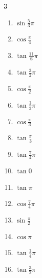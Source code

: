 \begin{multicols}{3}
\begin{enumerate}
  \item $\displaystyle \sin{\frac{5}{3}\pi}$

  \item $\displaystyle \cos{\frac{\pi}{4}}$

  \item $\displaystyle \tan{\frac{11}{6}\pi}$

  \item $\displaystyle \tan{\frac{3}{2}\pi}$
        \phantom{$\displaystyle \quad なし$}

  \item $\displaystyle \cos{\frac{\pi}{2}}$
        \phantom{$\displaystyle =0$}

  \item $\displaystyle \tan{\frac{3}{2}\pi}$
        \phantom{$\displaystyle \quad なし$}

  \item $\displaystyle \cos{\frac{\pi}{3}}$

\columnbreak %

  \item $\displaystyle \tan{\frac{\pi}{3}}$

  \item $\displaystyle \tan{\frac{7}{4}\pi}$
        \phantom{$\displaystyle =-1$}

  \item $\displaystyle \tan{0}$
        \phantom{$\displaystyle =0$}

  \item $\displaystyle \tan{\pi}$
        \phantom{$\displaystyle =0$}

  \item $\displaystyle \cos{\frac{7}{4}\pi}$

  \item $\displaystyle \sin{\frac{\pi}{2}}$
        \phantom{$\displaystyle =1$}

  \item $\displaystyle \cos{\pi}$
        \phantom{$\displaystyle =-1$}

  \item $\displaystyle \tan{\frac{3}{4}\pi}$
        \phantom{$\displaystyle =-1$}

  \item $\displaystyle \tan{\frac{3}{2}\pi}$
        \phantom{$\displaystyle \quad なし$}


\end{enumerate}
\end{multicols}
